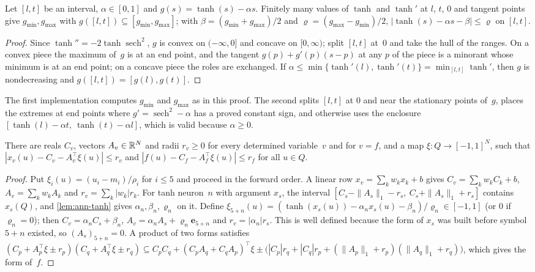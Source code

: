 \begin{lemma}\label{lem:ann-tanh}
Let $[l,t]$ be an interval, $\alpha\in[0,1]$ and $g(s)=\tanh(s)-\alpha s$.
Finitely many values of $\tanh$ and $\tanh'$ at $l$, $t$, $0$ and tangent points give $g_{\min},g_{\max}$ with $g([l,t])\subseteq[g_{\min},g_{\max}]$; with $\beta=(g_{\min}+g_{\max})/2$ and $\varrho=(g_{\max}-g_{\min})/2$, $|\tanh(s)-\alpha s-\beta|\le\varrho$ on $[l,t]$.
\end{lemma}

\begin{proof}
Since $\tanh''=-2\tanh\operatorname{sech}^2$, $g$ is convex on $(-\infty,0]$ and concave on $[0,\infty)$; split $[l,t]$ at~$0$ and take the hull of the ranges.
On a convex piece the maximum of~$g$ is at an end point, and the tangent $g(p)+g'(p)(s-p)$ at any $p$ of the piece is a minorant whose minimum is at an end point; on a concave piece the roles are exchanged.
If $\alpha\le\min\{\tanh'(l),\tanh'(t)\}=\min_{[l,t]}\tanh'$, then $g$ is nondecreasing and $g([l,t])=[g(l),g(t)]$.
\end{proof}

The first implementation computes $g_{\min}$ and $g_{\max}$ as in this proof.
The second splits $[l,t]$ at $0$ and near the stationary points of~$g$, places the extremes at end points where $g'=\operatorname{sech}^2-\alpha$ has a proved constant sign, and otherwise uses the enclosure $[\tanh(l)-\alpha t,\ \tanh(t)-\alpha l]$, which is valid because $\alpha\ge0$.

\begin{lemma}\label{lem:ann-affine}
There are reals $C_v$, vectors $A_v\in\mathbb{R}^N$ and radii $r_v\ge0$ for every determined variable~$v$ and for $v=f$, and a map $\xi:Q\to[-1,1]^N$, such that $|x_v(u)-C_v-A_v^{\top}\xi(u)|\le r_v$ and $|f(u)-C_f-A_f^{\top}\xi(u)|\le r_f$ for all $u\in Q$.
\end{lemma}

\begin{proof}
Put $\xi_i(u)=(u_i-m_i)/\rho_i$ for $i\le5$ and proceed in the forward order.
A linear row $x_v=\sum_kw_kx_k+b$ gives $C_v=\sum_kw_kC_k+b$, $A_v=\sum_kw_kA_k$ and $r_v=\sum_k|w_k|r_k$.
For tanh neuron~$n$ with argument $x_s$, the interval $[C_s-\|A_s\|_1-r_s,\ C_s+\|A_s\|_1+r_s]$ contains $x_s(Q)$, and \cref{lem:ann-tanh} gives $\alpha_n,\beta_n,\varrho_n$ on it.
Define $\xi_{5+n}(u)=(\tanh(x_s(u))-\alpha_nx_s(u)-\beta_n)/\varrho_n\in[-1,1]$ (or $0$ if $\varrho_n=0$); then $C_v=\alpha_nC_s+\beta_n$, $A_v=\alpha_nA_s+\varrho_n\mathbf e_{5+n}$ and $r_v=|\alpha_n|r_s$.
This is well defined because the form of $x_s$ was built before symbol $5+n$ existed, so $(A_s)_{5+n}=0$.
A product of two forms satisfies $(C_p+A_p^{\top}\xi\pm r_p)(C_q+A_q^{\top}\xi\pm r_q)\subseteq C_pC_q+(C_pA_q+C_qA_p)^{\top}\xi\pm\bigl(|C_p|r_q+|C_q|r_p+(\|A_p\|_1+r_p)(\|A_q\|_1+r_q)\bigr)$, which gives the form of~$f$.
\end{proof}

